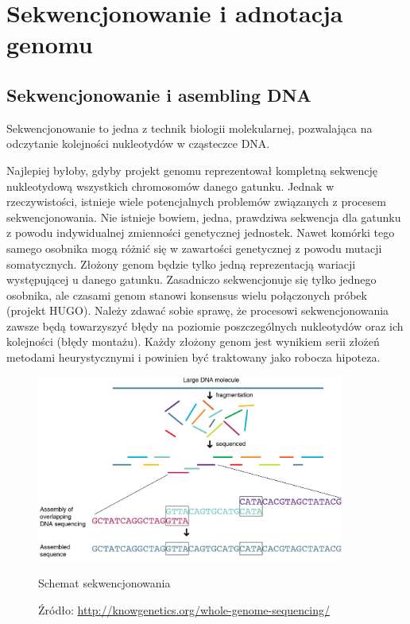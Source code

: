 \chapter{Sekwencjonowanie i adnotacja genomu}
\label{section:biologiny_wstep}

\section{Sekwencjonowanie i asembling DNA}
Sekwencjonowanie to jedna z technik biologii molekularnej, pozwalająca na odczytanie kolejności nukleotydów w cząsteczce DNA.

Najlepiej byłoby, gdyby projekt genomu reprezentował kompletną sekwencję nukleotydową wszystkich chromosomów danego gatunku. 
Jednak w rzeczywistości, istnieje wiele potencjalnych problemów związanych z procesem sekwencjonowania. Nie istnieje bowiem, jedna, prawdziwa sekwencja dla gatunku z powodu indywidualnej zmienności genetycznej jednostek. 
Nawet komórki tego samego osobnika mogą różnić się w zawartości genetycznej z powodu mutacji somatycznych. Złożony genom będzie tylko jedną reprezentacją wariacji występującej u danego gatunku. 
Zasadniczo sekwencjonuje się tylko jednego osobnika, ale czasami genom stanowi konsensus wielu połączonych próbek (projekt HUGO). 
Należy zdawać sobie sprawę, że procesowi sekwencjonowania zawsze będą towarzyszyć błędy na poziomie poszczególnych nukleotydów oraz ich kolejności (błędy montażu). 
Każdy złożony genom jest wynikiem serii złożeń metodami heurystycznymi i powinien być traktowany jako robocza hipoteza.

\begin{figure}[h]
	\centering
	\includegraphics[width=0.9\textwidth]{img/sequenctioning-process.png}
	\caption{Schemat sekwencjonowania}
	\vspace{-0.5cm}
	\caption*{\scriptsize Źródło: \url{http://knowgenetics.org/whole-genome-sequencing/}}
	\label{img:schemat-sekwencjonowania}
\end{figure}

